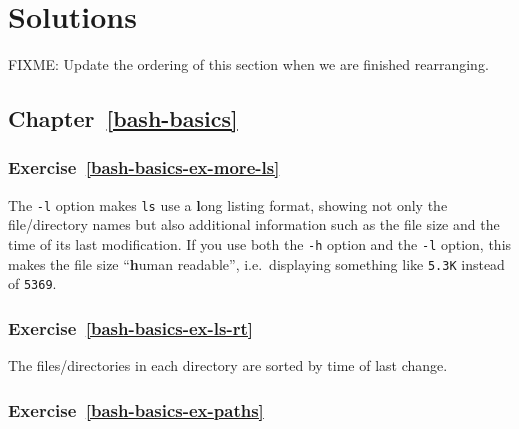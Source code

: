 \documentclass[
]{krantz}
\begin{document}
\hypertarget{solutions}{%
\chapter{Solutions}\label{solutions}}

FIXME: Update the ordering of this section when we are finished rearranging.

\hypertarget{chapter-refbash-basics}{%
\section*{Chapter~\ref{bash-basics}}\label{chapter-refbash-basics}}

\hypertarget{exercise-refbash-basics-ex-more-ls}{%
\subsection*{Exercise~\ref{bash-basics-ex-more-ls}}\label{exercise-refbash-basics-ex-more-ls}}


The \texttt{-l} option makes \texttt{ls} use a \textbf{l}ong listing format, showing not only
the file/directory names but also additional information such as the file size
and the time of its last modification. If you use both the \texttt{-h} option and the \texttt{-l} option,
this makes the file size ``\textbf{h}uman readable'', i.e.~displaying something like \texttt{5.3K}
instead of \texttt{5369}.

\hypertarget{exercise-refbash-basics-ex-ls-rt}{%
\subsection*{Exercise~\ref{bash-basics-ex-ls-rt}}\label{exercise-refbash-basics-ex-ls-rt}}


The files/directories in each directory are sorted by time of last change.

\hypertarget{exercise-refbash-basics-ex-paths}{%
\subsection*{Exercise~\ref{bash-basics-ex-paths}}\label{exercise-refbash-basics-ex-paths}}
\end{document}
